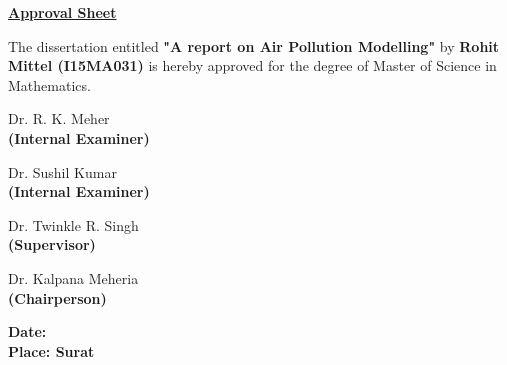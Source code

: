 \documentclass{report}
\begin{document}
\begin{center}
\textbf{\underline{{\LARGE Approval Sheet}}} \\
\end{center}

\vspace{0.5cm}

    {\large The dissertation entitled \textbf{"A report on Air Pollution Modelling"} by \textbf{Rohit Mittel (I15MA031)} is hereby approved for the degree of Master of Science in Mathematics.}
    
    \vspace{2cm}
    
    \begin{flushright}
    
\begin{large}
   
    Dr. R. K. Meher \\
    \textbf{(Internal Examiner)} \\
\vspace{2cm}
    
        Dr. Sushil Kumar \\
    \textbf{(Internal Examiner)} \\

\vspace{2cm}
    
        Dr. Twinkle R. Singh \\
    \textbf{(Supervisor)} \\
    
\vspace{2cm}
    
        Dr. Kalpana Meheria \\
    \textbf{(Chairperson)} \\
    
\vspace{2cm}
\end{large}

    \end{flushright}
\begin{flushleft}

\begin{large}
\textbf{Date: } \\
\textbf{Place: Surat}
\end{large}

\end{flushleft}
\end{document}
